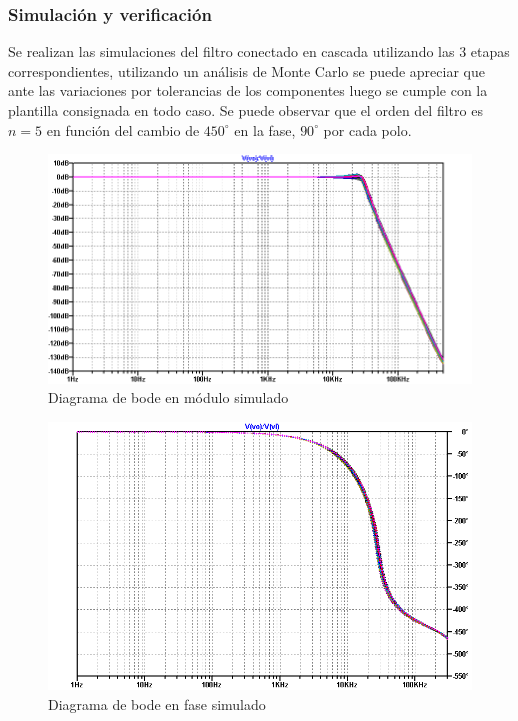 \subsubsection{Simulaci\'on y verificaci\'on}
Se realizan las simulaciones del filtro conectado en cascada utilizando las 3 etapas correspondientes, utilizando un an\'alisis de Monte Carlo se puede apreciar que ante las variaciones por tolerancias
de los componentes luego se cumple con la plantilla consignada en todo caso. Se puede observar que el orden del filtro es $n = 5$ en funci\'on del cambio de $450^{\circ}$ en la fase, $90^{\circ}$ por cada polo.

\begin{figure}[H]
    \centering
    \includegraphics[scale=0.6]{../EJ1/Recursos/legendre_verificacion_magnitud.png}
    \caption{Diagrama de bode en m\'odulo simulado}
\end{figure}

\begin{figure}[H]
    \centering
    \includegraphics[scale=0.6]{../EJ1/Recursos/legendre_verificacion_fase.png}
    \caption{Diagrama de bode en fase simulado}
\end{figure}

